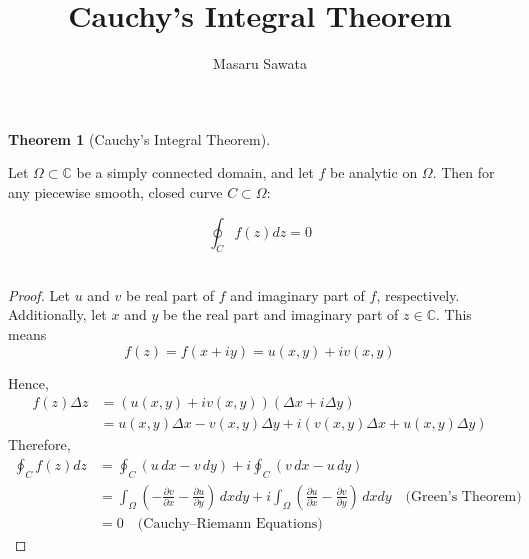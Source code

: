 \documentclass[letterpaper, 12pt]{article}
\title{Cauchy's Integral Theorem}
\author{Masaru Sawata}
\theoremstyle{custom}
\newtheorem*{theorem}{Theorem}
\begin{document}
\maketitle

\begin{theorem}[Cauchy's Integral Theorem]
\end{theorem}
Let $\Omega \subset \mathbb{C}$ be a simply connected domain, and let $f$ be analytic on $\Omega$. Then for any piecewise smooth, closed curve $C \subset \Omega$:

\begin{equation*}
  \oint_C f(z) dz = 0
\end{equation*}\\
\begin{proof}
  Let $u$ and $v$ be real part of $f$ and imaginary part of $f$, respectively.
  Additionally, let $x$ and $y$ be the real part and imaginary part of $z \in \mathbb{C} $.
  This means
  \begin{equation*}
    f(z) = f(x + iy) = u(x, y) + iv(x, y)
  \end{equation*}

  Hence, 
  \begin{align*}
    f(z) \Delta z &= \left( u(x, y) + iv(x, y) \right) \left( \Delta x + i\Delta y \right) \\
                  &= u(x, y) \Delta x - v(x, y)\Delta y +  i \left( v(x, y) \Delta x + u(x, y) \Delta y \right)
  \end{align*}
  Therefore,
  \begin{align*}
    \oint_C f(z) dz &= \oint_C \left( u \, dx - v \, dy \right)  + i  \oint_C \left( v \, dx - u \, dy \right)\\
    &= \int_\Omega \left( -\frac{\partial v}{\partial x} - \frac{\partial u}{\partial y} \right) \, dxdy + i \int_\Omega \left( \frac{\partial u}{\partial x} - \frac{\partial v}{\partial y} \right) \, dxdy \quad \text{(Green's Theorem)}\\
    &= 0 \quad \text{(Cauchy--Riemann Equations)}
  \end{align*}
\end{proof}
\end{document}
